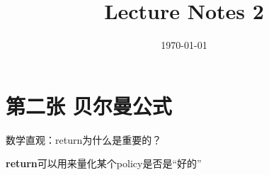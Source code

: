 \documentclass{article}
\begin{document}
\title{Lecture Notes 2}
\author{}
\date{\today}
\maketitle
\section{第二张 贝尔曼公式}
数学直观：return为什么是重要的？

\textbf{return}可以用来量化某个policy是否是“好的”
\end{document}
